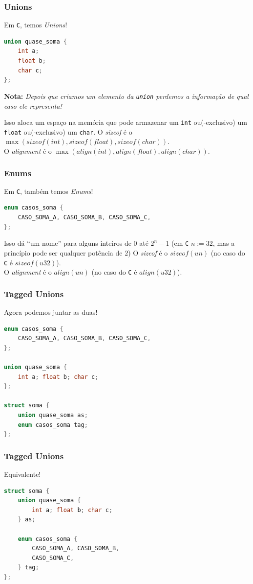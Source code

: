 \documentclass{beamer}
\newcommand{\lang}[1]{\texttt{#1}}
\newcommand{\inlcode}[1]{\texttt{#1}}
\newcommand{\nota}[1]{\textbf{Nota:}\textit{ #1}}
\begin{document}
\begin{frame}[fragile]
    \frametitle{Unions}
    Em \lang{C}, temos \emph{Unions}!
    \vfill
    \begin{multicols}{2}
        \begin{lstlisting}[language=C]
union quase_soma {
    int a;
    float b;
    char c;
};
        \end{lstlisting}
        \columnbreak
        \nota{Depois que criamos um elemento da \inlcode{union}
        perdemos a informação de qual caso ele representa!}
    \end{multicols}
    \vfill
    Isso aloca um espaço na memória que pode armazenar
    um \inlcode{int} ou(-exclusivo)
    um \inlcode{float} ou(-exclusivo)
    um \inlcode{char}.
    \vfill
    O \emph{sizeof} é o
    \(\max(sizeof(int), sizeof(float), sizeof(char))\).
    \\
    O \emph{alignment} é o
    \(\max(align(int), align(float), align(char))\).
\end{frame}

\begin{frame}[fragile]
    \frametitle{Enums}
    Em \lang{C}, também temos \emph{Enums}!
    \vfill
    \begin{lstlisting}[language=C]
enum casos_soma {
    CASO_SOMA_A, CASO_SOMA_B, CASO_SOMA_C,
};
    \end{lstlisting}
    \vfill
    Isso dá ``um nome'' para alguns inteiros de \(0\) até \(2^n-1\)
    (em \lang{C} \(n := 32\),
    mas a princípio pode ser qualquer potência de \(2\))
    \vfill
    O \emph{sizeof} é o \(sizeof(un)\)
    (no caso do \lang{C} é \(sizeof(u32)\)).
    \\
    O \emph{alignment} é o \(align(un)\)
    (no caso do \lang{C} é \(align(u32)\)).
\end{frame}

\begin{frame}[fragile]
    \frametitle{Tagged Unions}
    Agora podemos juntar as duas!
    \vfill
    \begin{lstlisting}[language=C]
enum casos_soma {
    CASO_SOMA_A, CASO_SOMA_B, CASO_SOMA_C,
};

union quase_soma {
    int a; float b; char c;
};

struct soma {
    union quase_soma as;
    enum casos_soma tag;
};
    \end{lstlisting}
\end{frame}

\begin{frame}[fragile]
    \frametitle{Tagged Unions}
    Equivalente!
    \vfill
    \begin{lstlisting}[language=C]
struct soma {
    union quase_soma {
        int a; float b; char c;
    } as;

    enum casos_soma {
        CASO_SOMA_A, CASO_SOMA_B,
        CASO_SOMA_C,
    } tag;
};
    \end{lstlisting}
\end{frame}
\end{document}
